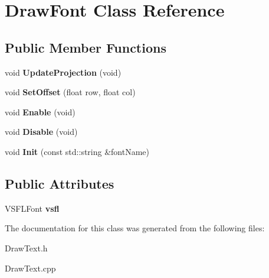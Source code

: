 \hypertarget{classDrawFont}{\section{\-Draw\-Font \-Class \-Reference}
\label{classDrawFont}
}
\subsection*{\-Public \-Member \-Functions}
\begin{DoxyCompactItemize}
\item 
\hypertarget{classDrawFont_ab65062370529725d0bd8d3da80356b9c}{void {\bfseries \-Update\-Projection} (void)}\label{classDrawFont_ab65062370529725d0bd8d3da80356b9c}

\item 
\hypertarget{classDrawFont_a043f1ae634caac4a82e6e725a14e4a71}{void {\bfseries \-Set\-Offset} (float row, float col)}\label{classDrawFont_a043f1ae634caac4a82e6e725a14e4a71}

\item 
\hypertarget{classDrawFont_a0b97262ce99de92a639ccc44bf38fc55}{void {\bfseries \-Enable} (void)}\label{classDrawFont_a0b97262ce99de92a639ccc44bf38fc55}

\item 
\hypertarget{classDrawFont_a258f44fb5bac847546eb4ec963d88144}{void {\bfseries \-Disable} (void)}\label{classDrawFont_a258f44fb5bac847546eb4ec963d88144}

\item 
\hypertarget{classDrawFont_a432fb290d8f91bcf91a809ab0d6d147b}{void {\bfseries \-Init} (const std\-::string \&font\-Name)}\label{classDrawFont_a432fb290d8f91bcf91a809ab0d6d147b}

\end{DoxyCompactItemize}
\subsection*{\-Public \-Attributes}
\begin{DoxyCompactItemize}
\item 
\hypertarget{classDrawFont_a15cbb37666cd5d3cc7826df778caec30}{\-V\-S\-F\-L\-Font {\bfseries vsfl}}\label{classDrawFont_a15cbb37666cd5d3cc7826df778caec30}

\end{DoxyCompactItemize}


\-The documentation for this class was generated from the following files\-:\begin{DoxyCompactItemize}
\item 
\-Draw\-Text.\-h\item 
\-Draw\-Text.\-cpp\end{DoxyCompactItemize}

